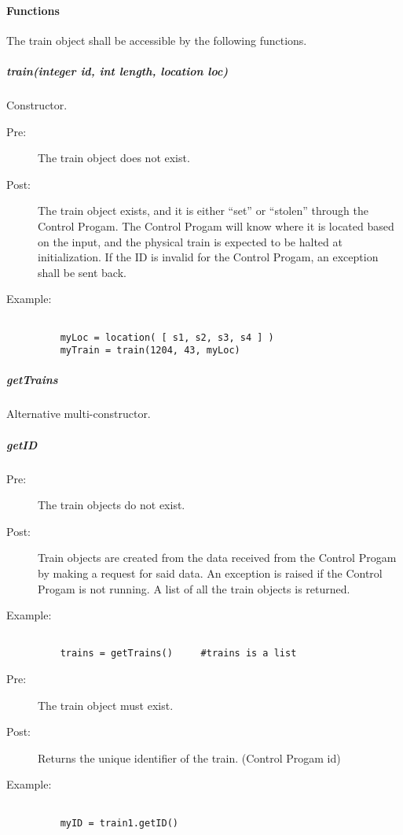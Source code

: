 \documentclass[a4paper,11pt,notitlepage]{article}
\def\CS{Control Progam\xspace}
\begin{document}
\paragraph{Functions}
The train object shall be accessible by the following functions.
\subparagraph{train(integer id, int length, location loc)} Constructor.
\begin{description}
\item[\hspace{1cm}Pre:] The train object does not exist.
\item[\hspace{1cm}Post:] The train object exists, and it is either ``set'' or ``stolen'' through the \CS. The \CS will know where it is located based on the input, and the physical train is expected to be halted at initialization. If the ID is invalid for the \CS, an exception shall be sent back.
\item[\hspace{1cm}Example:]
\begin{verbatim}

	myLoc = location( [ s1, s2, s3, s4 ] )
    myTrain = train(1204, 43, myLoc)
\end{verbatim}
\end{description}

\subparagraph{getTrains} Alternative multi-constructor.
\subparagraph{getID}
\begin{description}
\item[\hspace{1cm}Pre:] The train objects do not exist.
\item[\hspace{1cm}Post:] Train objects are created from the data received from the \CS by making a request for said data. An exception is raised if the \CS is not running. A list of all the train objects is returned.
\item[\hspace{1cm}Example:]
\begin{verbatim}

    trains = getTrains()     #trains is a list
\end{verbatim}
\end{description}

\begin{description}
\item[\hspace{1cm}Pre:] The train object must exist.
\item[\hspace{1cm}Post:] Returns the unique identifier of the train. (\CS id)
\item[\hspace{1cm}Example:]
\begin{verbatim}

    myID = train1.getID()
\end{verbatim}
\end{description}
\end{document}
